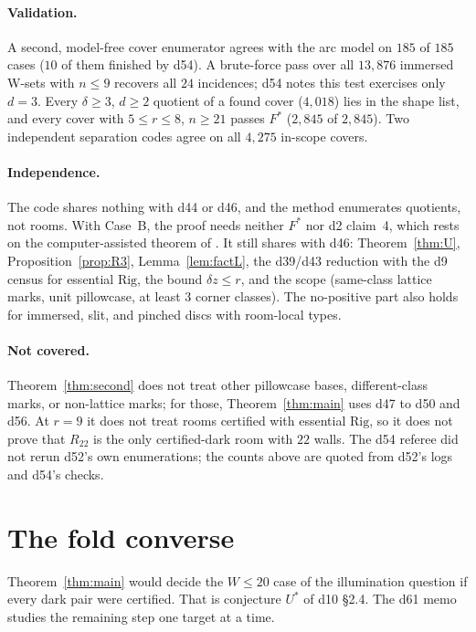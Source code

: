 \documentclass[11pt]{article}
\theoremstyle{definition}
\theoremstyle{remark}
\newcommand{\Rig}{\mathrm{Rig}}
\newcommand{\Rr}{R_{22}}
\begin{document}
\paragraph{Validation.}
A second, model-free cover enumerator agrees with the arc model on $185$ of
$185$ cases ($10$ of them finished by d54). A brute-force pass over all
$13{,}876$ immersed W-sets with $n\le 9$ recovers all $24$ incidences; d54
notes this test exercises only $d=3$. Every $\delta\ge 3$, $d\ge 2$ quotient of
a found cover ($4{,}018$) lies in the shape list, and every cover with
$5\le r\le 8$, $n\ge 21$ passes $F^*$ ($2{,}845$ of $2{,}845$). Two
independent separation codes agree on all $4{,}275$ in-scope covers.

\paragraph{Independence.}
The code shares nothing with d44 or d46, and the method enumerates quotients,
not rooms. With Case~B, the proof needs neither $F^*$ nor d2 claim~4, which
rests on the computer-assisted theorem of \cite{K6}. It still shares with d46:
Theorem~\ref{thm:U}, Proposition~\ref{prop:R3}, Lemma~\ref{lem:factL}, the
d39/d43 reduction with the d9 census for essential $\Rig$, the bound
$\delta z\le r$, and the scope (same-class lattice marks, unit pillowcase, at
least $3$ corner classes). The no-positive part also holds for immersed,
slit, and pinched discs with room-local types.

\paragraph{Not covered.}
Theorem~\ref{thm:second} does not treat other pillowcase bases, different-class
marks, or non-lattice marks; for those, Theorem~\ref{thm:main} uses d47 to d50
and d56. At $r=9$ it does not treat rooms certified with essential $\Rig$, so it
does not prove that $\Rr$ is the only certified-dark room with $22$ walls. The
d54 referee did not rerun d52's own enumerations; the counts above are quoted
from d52's logs and d54's checks.

\section{The fold converse}\label{sec:converse}

Theorem~\ref{thm:main} would decide the $W\le 20$ case of the illumination
question if every dark pair were certified. That is conjecture $U^*$ of d10
\S2.4. The d61 memo studies the remaining step one target at a time.
\end{document}

